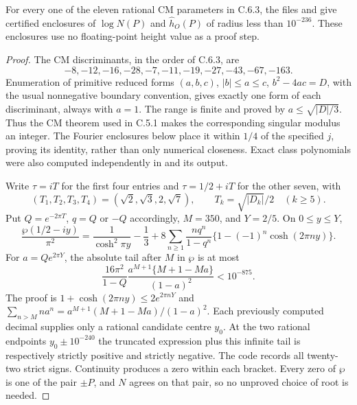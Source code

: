 \begin{statement}
For every one of the eleven rational CM parameters in C.6.3,
the files  and
 give certified enclosures of
$\log N(P)$ and $\widehat h_O(P)$ of radius less than
$10^{-236}$. These enclosures use no floating-point height
value as a proof step.
\end{statement}
\begin{proof}
The CM discriminants, in the order of C.6.3, are
\[
 -8,-12,-16,-28,-7,-11,-19,-27,-43,-67,-163.
\]
Enumeration of primitive reduced forms
$(a,b,c)$, $|b|\le a\le c$, $b^2-4ac=D$, with the usual
nonnegative boundary convention, gives exactly one form of
each discriminant, always with $a=1$.
The range is finite and proved by $a\le\sqrt{|D|/3}$.
Thus the CM theorem used in C.5.1 makes the corresponding
singular modulus an integer. The Fourier enclosures below
place it within $1/4$ of the specified $j$, proving its
identity, rather than only numerical closeness. Exact class
polynomials were also computed independently in
 and its output.

Write $\tau=iT$ for the first four entries and
$\tau=1/2+iT$ for the other seven, with
\[
 (T_1,T_2,T_3,T_4)=(\sqrt2,\sqrt3,2,\sqrt7),\qquad
 T_k=\sqrt{|D_k|}/2\quad(k\ge5).
\]
Put $Q=e^{-2\pi T}$, $q=Q$ or $-Q$ accordingly,
$M=350$, and $Y=2/5$. On $0\le y\le Y$,
\begin{equation}\label{eq:ch-wp-bracket}
 \frac{\wp(1/2-iy)}{\pi^2}
 =\frac1{\cosh^2\pi y}-\frac13+
 8\sum_{n\ge1}\frac{nq^n}{1-q^n}
                 \{1-(-1)^n\cosh(2\pi ny)\}.
\end{equation}
For $a=Qe^{2\pi Y}$, the absolute tail after $M$ in
$\wp$ is at most
\[
 \frac{16\pi^2}{1-Q}
 \frac{a^{M+1}\{M+1-Ma\}}{(1-a)^2}<10^{-875}.
\]
The proof is $1+\cosh(2\pi ny)\le2e^{2\pi nY}$ and
$\sum_{n>M}na^n=a^{M+1}(M+1-Ma)/(1-a)^2$.
Each previously computed decimal supplies only a rational
candidate centre $y_0$. At the two rational endpoints
$y_0\pm10^{-240}$ the truncated expression plus this
infinite tail is respectively strictly positive and strictly
negative. The code records all twenty-two strict signs.
Continuity produces a zero within each bracket. Every zero
of $\wp$ is one of the pair $\pm P$, and $N$ agrees on
that pair, so no unproved choice of root is needed.


\end{proof}
